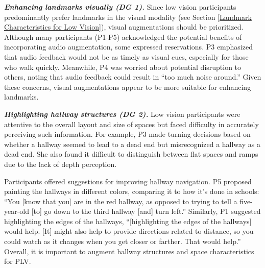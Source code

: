 \textbf{\textit{Enhancing landmarks visually (DG 1).}} Since low vision participants predominantly prefer landmarks in the visual modality (see Section \ref{Landmark Characteristics for Low Vision}), visual augmentations should be prioritized. Although many participants (P1-P5) acknowledged the potential benefits of incorporating audio augmentation, some expressed reservations. P3 emphasized that audio feedback would not be as timely as visual cues, especially for those who walk quickly. Meanwhile, P4 was worried about potential disruption to others, noting that audio feedback could result in ``too much noise around.'' Given these concerns, visual augmentations appear to be more suitable for enhancing landmarks.

\textbf{\textit{Highlighting hallway structures (DG 2).}} Low vision participants were attentive to the overall layout and size of spaces but faced difficulty in accurately perceiving such information. For example, P3 made turning decisions based on whether a hallway seemed to lead to a dead end but misrecognized a hallway as a dead end. %
She also found it difficult to distinguish between flat spaces and ramps due to the lack of depth perception. %

Participants offered suggestions for improving hallway navigation. P5 proposed painting the hallways in different colors, comparing it to how it’s done in schools: ``You [know that you] are in the red hallway, as opposed to trying to tell a five-year-old [to] go down to the third hallway [and] turn left.'' Similarly, P1 suggested highlighting the edges of the hallways, ``[highlighting the edges of the hallways] would help. [It] might also help to provide directions related to distance, so you could watch as it changes when you get closer or farther. That would help.'' Overall, it is important to augment hallway structures and space characteristics for PLV.


